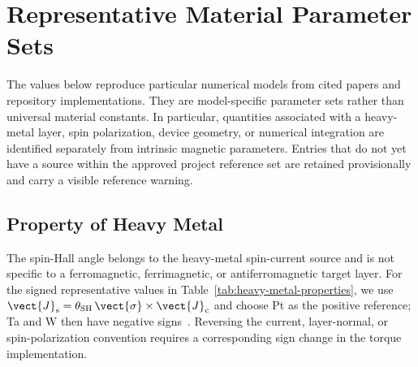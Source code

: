 \section{Representative Material Parameter Sets}

The values below reproduce particular numerical models from cited papers and
repository implementations.  They are model-specific parameter sets rather
than universal material constants.  In particular, quantities associated with
a heavy-metal layer, spin polarization, device geometry, or numerical
integration are identified separately from intrinsic magnetic parameters.
Entries that do not yet have a source within the approved project reference
set are retained provisionally and carry a visible reference warning.

\subsection{Property of Heavy Metal}

The spin-Hall angle belongs to the heavy-metal spin-current source and is not
specific to a ferromagnetic, ferrimagnetic, or antiferromagnetic target layer.
For the signed representative values in Table~\ref{tab:heavy-metal-properties},
we use
$\vect{J}_{\mathrm{s}}=\theta_{\mathrm{SH}}\,
    \vect{\sigma}\times\vect{J}_{\mathrm{c}}$ and choose Pt as the positive
reference; Ta and W then have negative signs~\cite{sot-stt-compact-model,
    liu2012ta-spin-hall,pai2012w-spin-hall}.  Reversing the current, layer-normal,
or spin-polarization convention requires a corresponding sign change in the
torque implementation.

